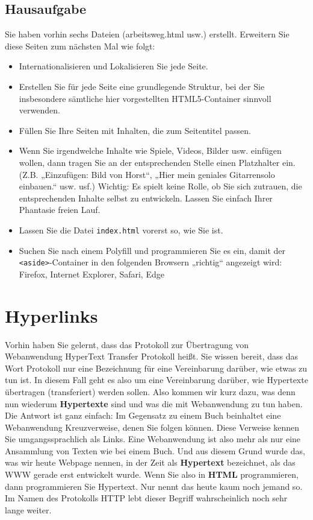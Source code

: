 \subsection{Hausaufgabe}

Sie haben vorhin sechs Dateien (arbeitsweg.html usw.) erstellt. Erweitern Sie diese Seiten zum nächsten Mal wie folgt:

\begin{itemize}
	\item Internationalisieren und Lokalisieren Sie jede Seite.
	\item Erstellen Sie für jede Seite eine grundlegende Struktur, bei der Sie insbesondere sämtliche hier vorgestellten HTML5-Container sinnvoll verwenden.
	\item Füllen Sie Ihre Seiten mit Inhalten, die zum Seitentitel passen.
	\item Wenn Sie irgendwelche Inhalte wie Spiele, Videos, Bilder usw. einfügen wollen, dann tragen Sie an der entsprechenden Stelle einen Platzhalter ein. (Z.B. „Einzufügen: Bild von Horst“, „Hier mein geniales Gitarrensolo einbauen.“ usw. usf.) Wichtig: Es spielt keine Rolle, ob Sie sich zutrauen, die entsprechenden Inhalte selbst zu entwickeln. Lassen Sie einfach Ihrer Phantasie freien Lauf.
	\item Lassen Sie die Datei \verb|index.html| vorerst so, wie Sie ist.          
	\item Suchen Sie nach einem Polyfill und programmieren Sie es ein, damit der \verb|<aside>|-Container in den folgenden Browsern „richtig“ angezeigt wird: Firefox, Internet Explorer, Safari, Edge
\end{itemize}

\section{Hyperlinks}

Vorhin haben Sie gelernt, dass das Protokoll zur Übertragung von Webanwendung HyperText Transfer Protokoll heißt. Sie wissen bereit, dass das Wort Protokoll nur eine Bezeichnung für eine Vereinbarung darüber, wie etwas zu tun ist. In diesem Fall geht es also um eine Vereinbarung darüber, wie Hypertexte übertragen (transferiert) werden sollen. Also kommen wir kurz dazu, was denn nun wiederum \textbf{Hypertexte} sind und was die mit Webanwendung zu tun haben.\\

Die Antwort ist ganz einfach: Im Gegensatz zu einem Buch beinhaltet eine Webanwendung Kreuzverweise, denen Sie folgen können. Diese Verweise kennen Sie umgangssprachlich als Links. Eine Webanwendung ist also mehr als nur eine Ansammlung von Texten wie bei einem Buch. Und aus diesem Grund wurde das, was wir heute Webpage nennen, in der Zeit als \textbf{Hypertext} bezeichnet, als das WWW gerade erst entwickelt wurde. Wenn Sie also in \textbf{HTML} programmieren, dann programmieren Sie Hypertext. Nur nennt das heute kaum noch jemand so. Im Namen des Protokolls HTTP lebt dieser Begriff wahrscheinlich noch sehr lange weiter.\\

